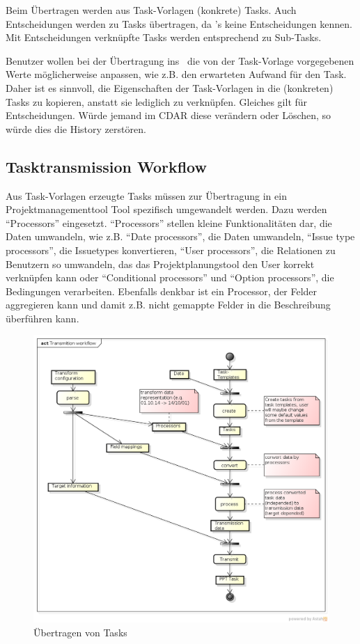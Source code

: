 				Beim Übertragen werden aus Task-Vorlagen (konkrete) Tasks.
				Auch Entscheidungen werden zu Tasks übertragen, da \ppt's keine Entscheidungen kennen.
				Mit Entscheidungen verknüpfte Tasks werden entsprechend zu Sub-Tasks.
				
				Benutzer wollen bei der Übertragung ins \ppt\ die von der Task-Vorlage vorgegebenen Werte möglicherweise anpassen, wie z.B. den erwarteten Aufwand für den Task.
				Daher ist es sinnvoll, die Eigenschaften der Task-Vorlagen in die (konkreten) Tasks zu kopieren, anstatt sie lediglich zu verknüpfen.
				Gleiches gilt für Entscheidungen. Würde jemand im CDAR diese verändern oder Löschen, so würde dies die History zerstören.
			
		
		\subsection{Tasktransmission Workflow}
			Aus Task-Vorlagen erzeugte Tasks müssen zur Übertragung in ein Projektmanagementtool
			Tool spezifisch umgewandelt werden. Dazu werden "`Processors"' eingesetzt.
			"`Processors"' stellen kleine Funktionalitäten dar, die Daten umwandeln, wie z.B. "`Date processors"', die Daten umwandeln, "`Issue type processors"', die Issuetypes konvertieren, "`User processors"', die Relationen zu Benutzern so umwandeln, das das Projektplanungstool den User korrekt verknüpfen kann oder "`Conditional processors"' und "`Option processors"', die Bedingungen verarbeiten.
			Ebenfalls denkbar ist ein Processor, der Felder aggregieren kann und damit z.B. nicht gemappte Felder in die Beschreibung überführen kann.
			
			\begin{figure}[H]
				\includegraphics[width=\textwidth]{architecture/media/img/transmissionWorkflow.png}
				\centering
				\caption{Übertragen von Tasks}
				\label{fig:transmissionWorkflow}
			\end{figure}
			
